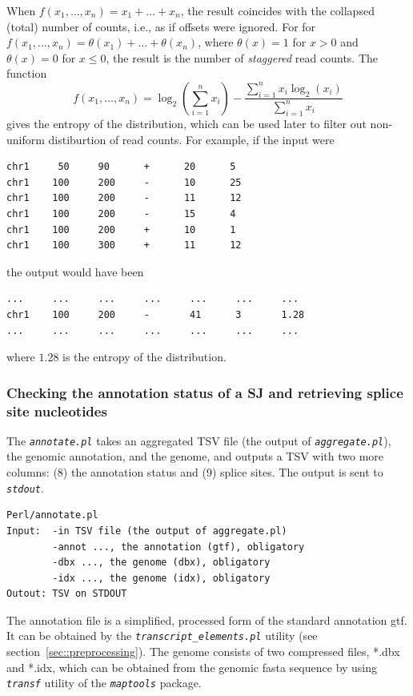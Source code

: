 \documentclass{article}
\newcommand{\prog}[1]{{\tt\em #1}}
\begin{document}
When $f(x_1,\dots,x_n) = x_1+\dots+x_n$, the result coincides with the collapsed (total) number of counts, i.e., as if offsets were ignored.
For for $f(x_1,\dots,x_n) = \theta(x_1)+\dots+\theta(x_n)$, where $\theta(x)=1$ for $x>0$ and $\theta(x)=0$ for $x\le0$, the result is the 
number of {\em staggered} read counts. The function 
$$f(x_1,\dots,x_n) = \log_2(\sum\limits_{i=1}^nx_i) - \frac{\sum\limits_{i=1}^nx_i\log_2(x_i)}{\sum\limits_{i=1}^nx_i}$$ 
gives the entropy of the distribution, which can be used later to filter out non-uniform distiburtion of read counts. 
For example, if the input were
\begin{verbatim}
chr1     50     90      +      20      5
chr1    100     200     -      10      25
chr1    100     200     -      11      12
chr1    100     200     -      15      4
chr1    100     200     +      10      1
chr1    100     300     +      11      12
\end{verbatim}
the output would have been
\begin{verbatim}
...     ...     ...     ...     ...     ...     ...
chr1    100     200     -       41      3       1.28
...     ...     ...     ...     ...     ...     ...
\end{verbatim}
where $1.28$ is the entropy of the distribution.


\subsubsection[Annotation status and splice site nucleotides]{Checking the annotation status of a SJ and retrieving splice site nucleotides}
\label{sec::annotation_status}
The \prog{annotate.pl} takes an aggregated TSV file (the output of \prog{aggregate.pl}), the genomic annotation, and the genome, and outputs a TSV 
with two more columns: (8) the annotation status and (9) splice sites. The output is sent to \prog{stdout}.
\begin{verbatim}
Perl/annotate.pl
Input:  -in TSV file (the output of aggregate.pl)
        -annot ..., the annotation (gtf), obligatory
        -dbx ..., the genome (dbx), obligatory
        -idx ..., the genome (idx), obligatory
Outout: TSV on STDOUT
\end{verbatim}
The annotation file is a simplified, processed form of the standard annotation gtf. It can be obtained by the \prog{transcript\_elements.pl} utility (see section~\ref{sec::preprocessing}).
The genome consists of two compressed files, *.dbx and *.idx, which can be obtained from the genomic fasta sequence by using \prog{transf} utility of the \prog{maptools} package. 
\end{document}
